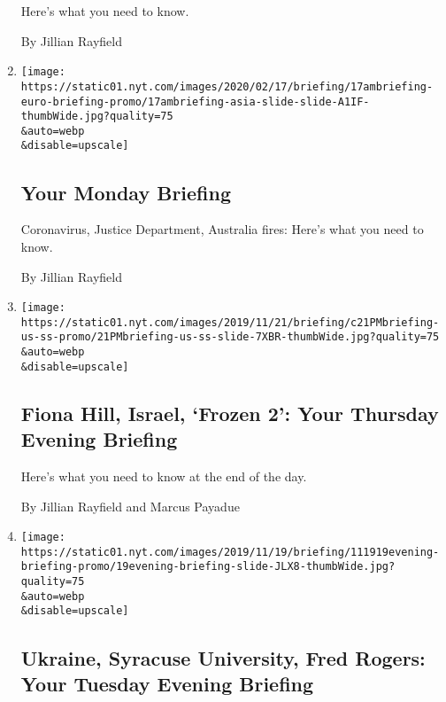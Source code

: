 \begin{enumerate}
  Here's what you need to know.

  By Jillian Rayfield
\item
  \href{/2020/02/17/briefing/coronavirus-justice-department-australia-fires.html}{}

  \texttt{[image: https://static01.nyt.com/images/2020/02/17/briefing/17ambriefing-euro-briefing-promo/17ambriefing-asia-slide-slide-A1IF-thumbWide.jpg?quality=75\\\&auto=webp\\\&disable=upscale]}

  \hypertarget{your-monday-briefing}{%
  \subsection{Your Monday Briefing}\label{your-monday-briefing}}

  Coronavirus, Justice Department, Australia fires: Here's what you need
  to know.

  By Jillian Rayfield
\item
  \href{/2019/11/21/briefing/fiona-hill-israel-frozen-2.html}{}

  \texttt{[image: https://static01.nyt.com/images/2019/11/21/briefing/c21PMbriefing-us-ss-promo/21PMbriefing-us-ss-slide-7XBR-thumbWide.jpg?quality=75\\\&auto=webp\\\&disable=upscale]}

  \hypertarget{fiona-hill-israel-frozen-2-your-thursday-evening-briefing}{%
  \subsection{Fiona Hill, Israel, `Frozen 2': Your Thursday Evening
  Briefing}\label{fiona-hill-israel-frozen-2-your-thursday-evening-briefing}}

  Here's what you need to know at the end of the day.

  By Jillian Rayfield and Marcus Payadue
\item
  \href{/2019/11/19/briefing/ukraine-syracuse-university-fred-rogers.html}{}

  \texttt{[image: https://static01.nyt.com/images/2019/11/19/briefing/111919evening-briefing-promo/19evening-briefing-slide-JLX8-thumbWide.jpg?quality=75\\\&auto=webp\\\&disable=upscale]}

  \hypertarget{ukraine-syracuse-university-fred-rogers-your-tuesday-evening-briefing}{%
  \subsection{Ukraine, Syracuse University, Fred Rogers: Your Tuesday
  Evening
  Briefing}\label{ukraine-syracuse-university-fred-rogers-your-tuesday-evening-briefing}}


\end{enumerate}
